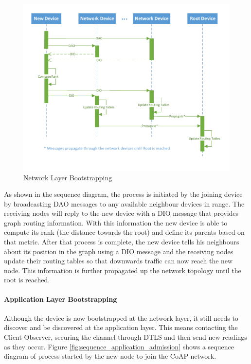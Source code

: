\begin{figure}[h]
  \centering
  \includegraphics[width=0.95\linewidth]{figures/Sequence_Network_Admission.pdf}
  \caption{Network Layer Bootstrapping}
  \label{fig:sequence_network_admission}
\end{figure}

As shown in the sequence diagram, the process is initiated by the joining device by broadcasting \gls{DAO} messages to any available neighbour devices in range. The receiving nodes will reply to the new device with a \gls{DIO} message that provides graph routing information. With this information the new device is able to compute its rank (the distance towards the root) and define its parents based on that metric. After that process is complete, the new device tells his neighbours about its position in the graph using a \gls{DIO} message and the receiving nodes update their routing tables so that downwards traffic can now reach the new node. This information is further propagated up the network topology until the root is reached.

\paragraph{\textbf{Application Layer Bootstrapping}}
\paragraph{}

Although the device is now bootstrapped at the network layer, it still needs to discover and be discovered at the application layer. This means contacting the Client Observer, securing the channel through \gls{DTLS} and then send new readings as they occur. Figure \ref{fig:sequence_application_admission} shows a sequence diagram of process started by the new node to join the \gls{CoAP} network.

